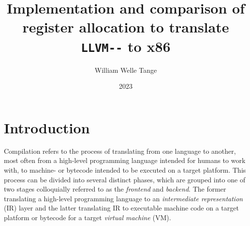 \documentclass{article}
\title{Implementation and comparison of register allocation to translate \lstinline!LLVM--! to x86}
\author{William Welle Tange}
\date{2023}
\begin{document}
\maketitle

\tableofcontents
\newpage



    

\section{Introduction}

Compilation refers to the process of translating from one language to another, most often from a high-level programming language intended for humans to work with, to machine- or bytecode intended to be executed on a target platform. This process can be divided into several distinct phases, which are grouped into one of two stages colloquially referred to as the \textit{frontend} and \textit{backend}. The former translating a high-level programming language to an \textit{intermediate representation} (IR) layer and the latter translating IR to executable machine code on a target platform or bytecode for a target \textit{virtual machine} (VM).
\end{document}
